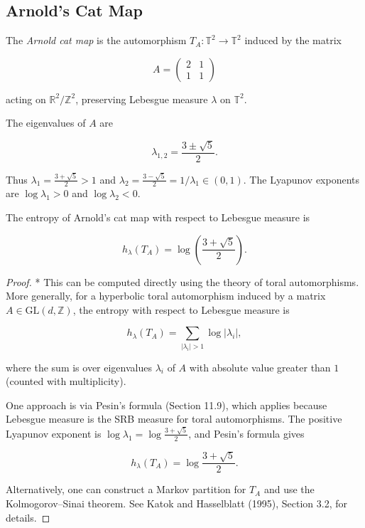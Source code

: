 \subsection{Arnold's Cat Map}\label{sec:11.6.3}

The \textit{Arnold cat map} is the automorphism $T_A \colon \mathbb{T}^2 \to \mathbb{T}^2$ induced by the matrix

\[
A = \begin{pmatrix} 2 & 1 \\ 1 & 1 \end{pmatrix}
\]

acting on $\mathbb{R}^2/\mathbb{Z}^2$, preserving Lebesgue measure $\lambda$ on $\mathbb{T}^2$.

The eigenvalues of $A$ are

\[
\lambda_{1,2} = \frac{3 \pm \sqrt{5}}{2}.
\]

Thus $\lambda_1 = \frac{3 + \sqrt{5}}{2} > 1$ and $\lambda_2 = \frac{3 - \sqrt{5}}{2} = 1/\lambda_1 \in (0,1)$. The Lyapunov exponents are $\log \lambda_1 > 0$ and $\log \lambda_2 < 0$.

\begin{proposition}\label{prop:11.23.}
The entropy of Arnold's cat map with respect to Lebesgue measure is

\[
h_\lambda(T_A) = \log\!\left(\frac{3 + \sqrt{5}}{2}\right).
\]
\end{proposition}


\begin{proof}
* This can be computed directly using the theory of toral automorphisms. More generally, for a hyperbolic toral automorphism induced by a matrix $A \in \mathrm{GL}(d, \mathbb{Z})$, the entropy with respect to Lebesgue measure is

\[
h_\lambda(T_A) = \sum_{|\lambda_i| > 1} \log |\lambda_i|,
\]

where the sum is over eigenvalues $\lambda_i$ of $A$ with absolute value greater than $1$ (counted with multiplicity).

One approach is via Pesin's formula (Section 11.9), which applies because Lebesgue measure is the SRB measure for toral automorphisms. The positive Lyapunov exponent is $\log \lambda_1 = \log\frac{3+\sqrt{5}}{2}$, and Pesin's formula gives

\[
h_\lambda(T_A) = \log\frac{3 + \sqrt{5}}{2}.
\]

Alternatively, one can construct a Markov partition for $T_A$ and use the Kolmogorov--Sinai theorem. See Katok and Hasselblatt (1995), Section 3.2, for details.
\end{proof}


